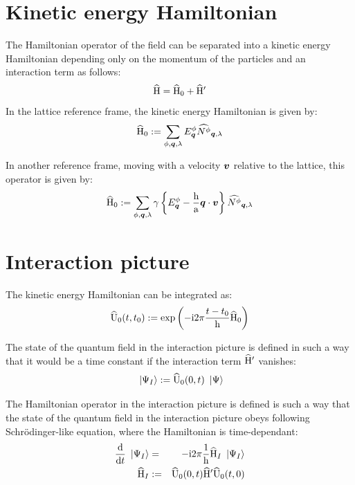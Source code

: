 \documentclass[10pt,a4paper,twoside,openany]{book}
\begin{document}
\section{Kinetic energy Hamiltonian}
\label{Kinetic energy Hamiltonian}

The Hamiltonian operator of the field can be separated into a kinetic energy Hamiltonian depending only on the momentum of the particles and an interaction term as follows:
\begin{equation*}
\widehat{\mathrm H} = \widehat{\mathrm H}_0 + \widehat{\mathrm H}'
\end{equation*}
In the lattice reference frame, the kinetic energy Hamiltonian is given by:
\begin{equation*}
\widehat{\mathrm H}_0 := \sum_{\phi,\boldsymbol{q},\lambda} E^{\phi}_{\boldsymbol{q}} \widehat{N^{\phi}}_{{\boldsymbol{q}}, {\lambda}}
\end{equation*}

In another reference frame, moving with a velocity $\boldsymbol{v}$ relative to the lattice, this operator is given by:
\begin{equation*}
\widehat{\mathrm H}_0 := \sum_{\phi,\boldsymbol{q},\lambda} \gamma \left\{ E^{\phi}_{\boldsymbol{q}} - \frac {\mathrm h} {\mathrm a} \boldsymbol{q} \cdot \boldsymbol{v} \right\} \widehat{N^{\phi}}_{{\boldsymbol{q}}, {\lambda}}
\end{equation*}

\section{Interaction picture}

The kinetic energy Hamiltonian can be integrated as:
\begin{equation*}
\widehat{\mathrm U}_0({t},{t_0}) := \mathrm{exp} \left( {- \mathrm{i} 2 \pi \frac{t - t_0} {\mathrm h} \widehat{\mathrm H}_0} \right)
\end{equation*}

The state of the quantum field in the interaction picture is defined in such a way that it would be a time constant if the interaction term $\widehat{\mathrm H}'$ vanishes:
\begin{equation*}
\ \left|{\Psi_I}\right\rangle := \widehat{\mathrm U}_0({0},{t}) \ \left|{\Psi}\right\rangle
\end{equation*}

The Hamiltonian operator in the interaction picture is defined is such a way that the state of the quantum field in the interaction picture obeys following Schrödinger-like equation, where the Hamiltonian is time-dependant:
\begin{eqnarray*}
\frac{\mathrm d}{\mathrm dt} \ \left|{\Psi_I}\right\rangle & = & -\mathrm{i} 2 \pi \frac 1 {\mathrm h} \widehat{\mathrm H}_I \ \left|{\Psi_I}\right\rangle \\
\widehat{\mathrm H}_I & := & \widehat{\mathrm U}_0({0},{t}) \widehat{\mathrm H}' \widehat{\mathrm U}_0({t},{0})
\end{eqnarray*}
\end{document}
